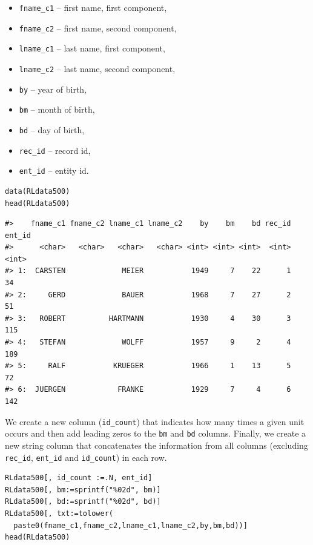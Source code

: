\begin{itemize}
\tightlist
\item
  \texttt{fname\_c1} -- first name, first component,
\item
  \texttt{fname\_c2} -- first name, second component,
\item
  \texttt{lname\_c1} -- last name, first component,
\item
  \texttt{lname\_c2} -- last name, second component,
\item
  \texttt{by} -- year of birth,
\item
  \texttt{bm} -- month of birth,
\item
  \texttt{bd} -- day of birth,
\item
  \texttt{rec\_id} -- record id,
\item
  \texttt{ent\_id} -- entity id.
\end{itemize}

\begin{verbatim}
data(RLdata500)
head(RLdata500)
\end{verbatim}

\begin{verbatim}
#>    fname_c1 fname_c2 lname_c1 lname_c2    by    bm    bd rec_id ent_id
#>      <char>   <char>   <char>   <char> <int> <int> <int>  <int>  <int>
#> 1:  CARSTEN             MEIER           1949     7    22      1     34
#> 2:     GERD             BAUER           1968     7    27      2     51
#> 3:   ROBERT          HARTMANN           1930     4    30      3    115
#> 4:   STEFAN             WOLFF           1957     9     2      4    189
#> 5:     RALF           KRUEGER           1966     1    13      5     72
#> 6:  JUERGEN            FRANKE           1929     7     4      6    142
\end{verbatim}

We create a new column (\texttt{id\_count}) that indicates how many times a given unit occurs and then add leading zeros to the \texttt{bm} and \texttt{bd} columns. Finally, we create a new string column that concatenates the information from all columns (excluding \texttt{rec\_id}, \texttt{ent\_id} and \texttt{id\_count}) in each row.

\begin{verbatim}
RLdata500[, id_count :=.N, ent_id]
RLdata500[, bm:=sprintf("%02d", bm)]
RLdata500[, bd:=sprintf("%02d", bd)]
RLdata500[, txt:=tolower(
  paste0(fname_c1,fname_c2,lname_c1,lname_c2,by,bm,bd))]
head(RLdata500)
\end{verbatim}

